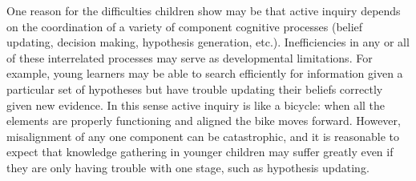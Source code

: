 \documentclass[man,floatsintext]{apa6}
\begin{document}
One reason for the difficulties children show may be that 
active inquiry depends on the coordination of a variety of 
component cognitive processes (belief updating, decision making, hypothesis generation, etc.).  
Inefficiencies in any or all of these interrelated processes may serve as developmental limitations.  
For example, young learners may be able to search efficiently for information given a particular 
set of hypotheses but have trouble updating their beliefs correctly given new evidence.
In this sense active inquiry is like a bicycle: when all the elements are properly functioning
and aligned the bike moves forward.  
However, misalignment of any one component can be catastrophic, and it is reasonable to expect
that knowledge gathering in younger children may suffer greatly even if they are only having trouble
with one stage, such as hypothesis updating.



\end{document}

